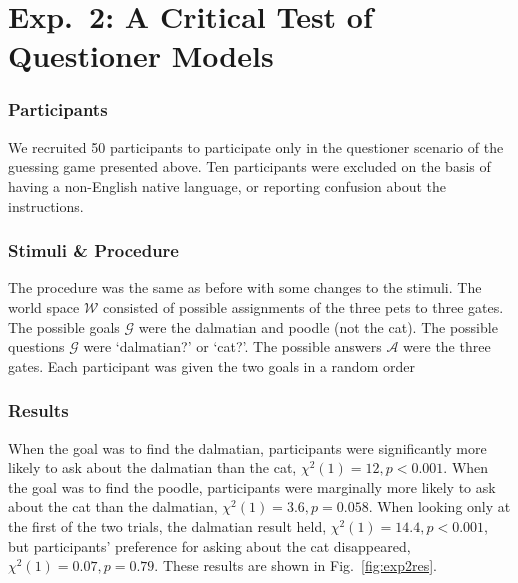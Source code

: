 \documentclass[12pt, floatsintext, man]{apa6}
\begin{document}
\section{Exp.~2: A Critical Test of Questioner Models}

\subsubsection{Participants} We recruited 50 participants to participate only in the questioner scenario of the guessing game presented above. Ten participants were excluded on the basis of having a non-English native language, or reporting confusion about the instructions.

\subsubsection{Stimuli \& Procedure} The procedure was the same as before with some changes to the stimuli. The world space $\mathcal{W}$ consisted of possible assignments of the three pets to three gates. The possible goals $\mathcal{G}$ were the dalmatian and poodle (not the cat). The possible questions $\mathcal{G}$ were `dalmatian?' or `cat?'.  The possible answers $\mathcal{A}$ were the three gates. Each participant was given the two goals in a random order%

\subsubsection{Results}

When the goal was to find the dalmatian, participants were significantly more likely to ask about the dalmatian than the cat, $\chi^2(1) = 12, p < 0.001$. When the goal was to find the poodle, participants were marginally more likely to ask about the cat than the dalmatian, $\chi^2(1) = 3.6, p = 0.058$. When looking only at the first of the two trials, the dalmatian result held, $\chi^2(1) = 14.4, p < 0.001$, but participants' preference for asking about the cat disappeared, $\chi^2(1) = 0.07, p = 0.79$. These results are shown in Fig.~\ref{fig:exp2res}.
\end{document}
